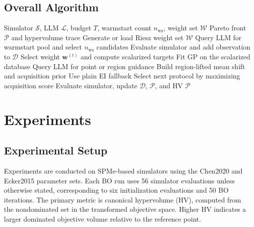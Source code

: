 \documentclass[journal]{IEEEtran}
\newcommand{\bw}{\boldsymbol{w}}
\newcommand{\bD}{\mathcal{D}}
\newcommand{\bS}{\mathcal{S}}
\newcommand{\bL}{\mathcal{L}}
\newcommand{\bW}{\mathcal{W}}
\newcommand{\bP}{\mathcal{P}}
\begin{document}
\subsection{Overall Algorithm}

\begin{algorithm}[t]
\caption{LLMBO-MO}
\label{alg:llmbo}
\begin{algorithmic}[1]
\Require Simulator $\bS$, LLM $\bL$, budget $T$, warmstart count
$n_{\mathrm{ws}}$, weight set $\bW$
\Ensure Pareto front $\bP$ and hypervolume trace
\State Generate or load Riesz weight set $\bW$
\State Query LLM for warmstart pool and select $n_{\mathrm{ws}}$ candidates
    \State Evaluate simulator and add observation to $\bD$
\EndFor
{}
    \State Select weight $\bw^{(t)}$ and compute scalarized targets
    \State Fit GP on the scalarized database
    \State Query LLM for point or region guidance
        \State Build region-lifted mean shift and acquisition prior
    \Else
        \State Use plain EI fallback
    \EndIf
    \State Select next protocol by maximizing acquisition score
    \State Evaluate simulator, update $\bD$, $\bP$, and HV
\EndFor
\State \Return $\bP$
\end{algorithmic}
\end{algorithm}

\section{Experiments}
\label{sec:experiments}

\subsection{Experimental Setup}

Experiments are conducted on SPMe-based simulators using the Chen2020 and
Ecker2015 parameter sets. Each BO run uses 56 simulator evaluations unless
otherwise stated, corresponding to six initialization evaluations and 50 BO
iterations. The primary metric is canonical hypervolume (HV), computed from the
nondominated set in the transformed objective space. Higher HV indicates a
larger dominated objective volume relative to the reference point.
\end{document}
